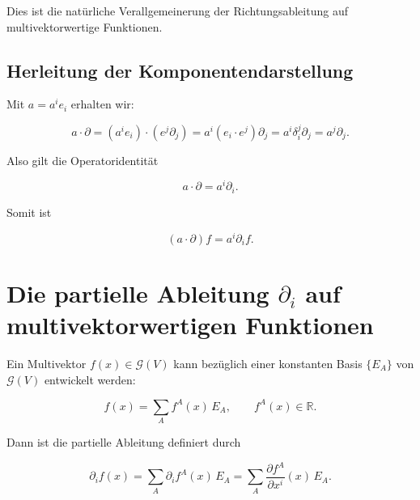 \documentclass[11pt]{article}
\begin{document}
Dies ist die natürliche Verallgemeinerung der Richtungsableitung auf multivektorwertige Funktionen.

\subsection{Herleitung der Komponentendarstellung}

Mit \(a = a^i e_i\) erhalten wir:

\[
a \cdot \partial
=
(a^i e_i) \cdot (e^j \partial_j)
=
a^i (e_i \cdot e^j) \partial_j
=
a^i \delta_i^j \partial_j
=
a^j \partial_j.
\]

Also gilt die Operatoridentität

\[
\boxed{
a \cdot \partial = a^i \partial_i
}.
\]

Somit ist

\[
\boxed{
(a \cdot \partial) f
=
a^i \partial_i f
}.
\]

\begin{center}
\end{center}

\section{Die partielle Ableitung \(\partial_i\) auf multivektorwertigen Funktionen}

Ein Multivektor \(f(x) \in \mathcal G(V)\) kann bezüglich einer konstanten Basis \(\{E_A\}\) von \(\mathcal G(V)\) entwickelt werden:

\[
\boxed{
f(x) = \sum_A f^A(x) \, E_A,
\qquad f^A(x) \in \mathbb R.
}
\]

Dann ist die partielle Ableitung definiert durch

\[
\boxed{
\partial_i f(x)
=
\sum_A \partial_i f^A(x) \, E_A
=
\sum_A \frac{\partial f^A}{\partial x^i}(x) \, E_A.
}
\]

\begin{center}
\end{center}
\end{document}

